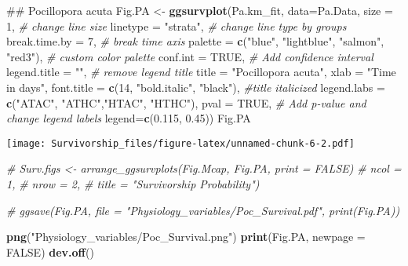 \documentclass[]{article}
\newenvironment{Shaded}{\begin{snugshade}}{\end{snugshade}}
\newcommand{\KeywordTok}[1]{\textcolor[rgb]{0.13,0.29,0.53}{\textbf{#1}}}
\newcommand{\DataTypeTok}[1]{\textcolor[rgb]{0.13,0.29,0.53}{#1}}
\newcommand{\DecValTok}[1]{\textcolor[rgb]{0.00,0.00,0.81}{#1}}
\newcommand{\FloatTok}[1]{\textcolor[rgb]{0.00,0.00,0.81}{#1}}
\newcommand{\StringTok}[1]{\textcolor[rgb]{0.31,0.60,0.02}{#1}}
\newcommand{\CommentTok}[1]{\textcolor[rgb]{0.56,0.35,0.01}{\textit{#1}}}
\newcommand{\OtherTok}[1]{\textcolor[rgb]{0.56,0.35,0.01}{#1}}
\newcommand{\NormalTok}[1]{#1}
\begin{document}
\begin{Shaded}
\begin{Highlighting}[]
\NormalTok{## Pocillopora acuta}
\NormalTok{Fig.PA <-}\StringTok{ }\KeywordTok{ggsurvplot}\NormalTok{(Pa.km_fit, }\DataTypeTok{data=}\NormalTok{Pa.Data, }\DataTypeTok{size =} \DecValTok{1}\NormalTok{,  }\CommentTok{# change line size}
           \DataTypeTok{linetype =} \StringTok{"strata"}\NormalTok{, }\CommentTok{# change line type by groups}
           \DataTypeTok{break.time.by =} \DecValTok{7}\NormalTok{, }\CommentTok{# break time axis}
           \DataTypeTok{palette =} \KeywordTok{c}\NormalTok{(}\StringTok{"blue"}\NormalTok{, }\StringTok{"lightblue"}\NormalTok{, }\StringTok{"salmon"}\NormalTok{, }\StringTok{"red3"}\NormalTok{), }\CommentTok{# custom color palette}
           \DataTypeTok{conf.int =} \OtherTok{TRUE}\NormalTok{, }\CommentTok{# Add confidence interval}
           \DataTypeTok{legend.title =} \StringTok{""}\NormalTok{, }\CommentTok{# remove legend title}
           \DataTypeTok{title =} \StringTok{"Pocillopora acuta"}\NormalTok{,}
           \DataTypeTok{xlab =} \StringTok{"Time in days"}\NormalTok{,}
           \DataTypeTok{font.title =} \KeywordTok{c}\NormalTok{(}\DecValTok{14}\NormalTok{, }\StringTok{"bold.italic"}\NormalTok{, }\StringTok{"black"}\NormalTok{), }\CommentTok{#title italicized}
           \DataTypeTok{legend.labs =} \KeywordTok{c}\NormalTok{(}\StringTok{"ATAC"}\NormalTok{, }\StringTok{"ATHC"}\NormalTok{,}\StringTok{"HTAC"}\NormalTok{, }\StringTok{"HTHC"}\NormalTok{), }\DataTypeTok{pval =} \OtherTok{TRUE}\NormalTok{, }\CommentTok{# Add p-value and change legend labels}
           \DataTypeTok{legend=}\KeywordTok{c}\NormalTok{(}\FloatTok{0.115}\NormalTok{, }\FloatTok{0.45}\NormalTok{))}
\NormalTok{Fig.PA}
\end{Highlighting}
\end{Shaded}

\texttt{[image: Survivorship\_files/figure-latex/unnamed-chunk-6-2.pdf]}

\begin{Shaded}
\begin{Highlighting}[]
\CommentTok{# Surv.figs <- arrange_ggsurvplots(Fig.Mcap, Fig.PA, print = FALSE)}
  \CommentTok{# ncol = 1,}
  \CommentTok{# nrow = 2,}
  \CommentTok{# title = "Survivorship Probability")}

\CommentTok{# ggsave(Fig.PA, file = "Physiology_variables/Poc_Survival.pdf", print(Fig.PA))}

\KeywordTok{png}\NormalTok{(}\StringTok{"Physiology_variables/Poc_Survival.png"}\NormalTok{)}
\KeywordTok{print}\NormalTok{(Fig.PA, }\DataTypeTok{newpage =} \OtherTok{FALSE}\NormalTok{)}
\KeywordTok{dev.off}\NormalTok{()}
\end{Highlighting}
\end{Shaded}
\end{document}
